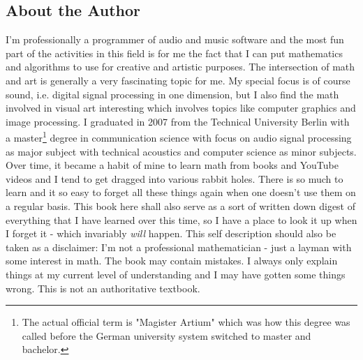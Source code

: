 


\subsection{About the Author}
I'm professionally a programmer of audio and music software and the most fun part of the activities in this field is for me the fact that I can put mathematics and algorithms to use for creative and artistic purposes. The intersection of math and art is generally a very fascinating topic for me. My special focus is of course sound, i.e. digital signal processing in one dimension, but I also find the math involved in visual art interesting which involves topics like computer graphics and image processing. I graduated in 2007 from the Technical University Berlin with a master\footnote{The actual official term is "Magister Artium" which was how this degree was called before the German university system switched to master and bachelor.} degree in communication science with focus on audio signal processing as major subject with technical acoustics and computer science as minor subjects. Over time, it became a habit of mine to learn math from books and YouTube videos and I tend to get dragged into various rabbit holes. There is so much to learn and it so easy to forget all these things again when one doesn't use them on a regular basis. This book here shall also serve as a sort of written down digest of everything that I have learned over this time, so I have a place to look it up when I forget it - which invariably \emph{will} happen. This self description should also be taken as a disclaimer: I'm not a professional mathematician - just a layman with some interest in math. The book may contain mistakes. I always only explain things at my current level of understanding and I may have gotten some things wrong. This is not an authoritative textbook.


